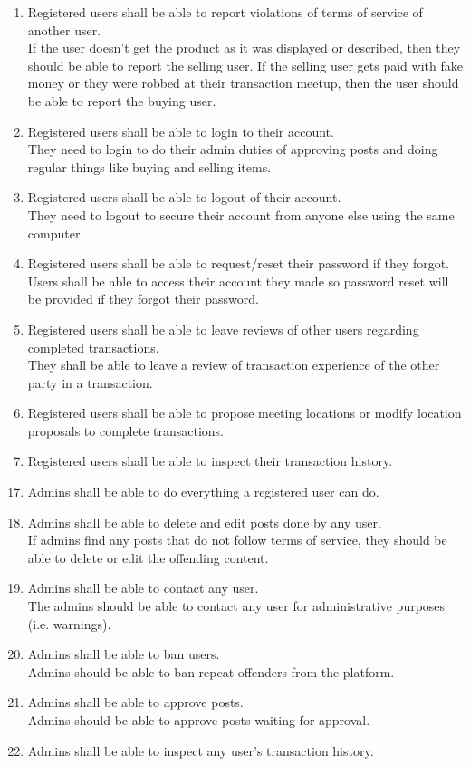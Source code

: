 \begin{description}[font=\itshape]
\begin{enumerate}
		\item Registered users shall be able to report violations of terms of service of another user.\\If the user doesn’t get the product as it was displayed or described, then they should be able to report the selling user. If the selling user gets paid with fake money or they were robbed at their transaction meetup, then the user should be able to report the buying user.
		\item Registered users shall be able to login to their account.\\They need to login to do their admin duties of approving posts and doing regular things like buying and selling items.
		\item Registered users shall be able to logout of their account.\\They need to logout to secure their account from anyone else using the same computer.
		\item Registered users shall be able to request/reset their password if they forgot.\\Users shall be able to access their account they made so password reset will be provided if they forgot their password.
		\item Registered users shall be able to leave reviews of other users regarding completed transactions.\\They shall be able to leave a review of transaction experience of the other party in a transaction.
		\item Registered users shall be able to propose meeting locations or modify location proposals to complete transactions.
		\item Registered users shall be able to inspect their transaction history.
    \end{enumerate}
\item[Admin]\hfill
    \begin{enumerate}
    	\setcounter{enumi}{16}
        \item Admins shall be able to do everything a registered user can do.
        \item Admins shall be able to delete and edit posts done by any user.\\If admins find any posts that do not follow terms of service, they should be able to delete or edit the offending content.
        \item Admins shall be able to contact any user.\\The admins should be able to contact any user for administrative purposes (i.e. warnings).
        \item Admins shall be able to ban users.\\Admins should be able to ban repeat offenders from the platform.
        \item Admins shall be able to approve posts.\\Admins should be able to approve posts waiting for approval.
        \item Admins shall be able to inspect any user's transaction history.
    \end{enumerate}

\end{description}
